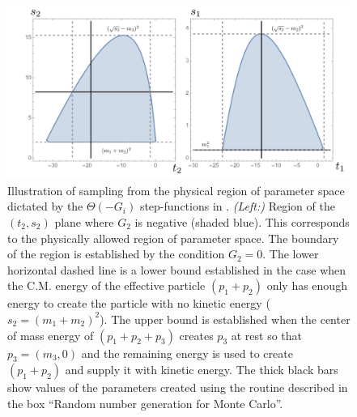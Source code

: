 \begin{figure}[htbp]
    \centering
    \includegraphics[width=0.9\linewidth]{figs/kinematic-variable-diagram.png}
    \caption{
        Illustration of sampling from the physical region of parameter space dictated by the $\Theta(-G_i)$ step-functions in . 
        \emph{(Left:)}
        Region of the $(t_2, s_2)$ plane where $G_2$ is negative (shaded blue).
        This corresponds to the physically allowed region of parameter space.
        The boundary of the region is established by the condition $G_2 = 0$.
        The lower horizontal dashed line is a lower bound established in the case when the C.M. energy of the effective particle $(p_1 + p_2)$ only has enough energy to create the particle with no kinetic energy ($s_2 = (m_1 + m_2)^2$). 
        The upper bound is established when the center of mass energy of $(p_1 + p_2 + p_3)$ creates $p_3$ at rest so that $p_3 = (m_3, 0)$ and the remaining energy is used to create $(p_1 + p_2)$ and supply it with kinetic energy.
        The thick black bars show values of the parameters created using the routine described in the box ``Random number generation for Monte Carlo''.
    }
    \label{<label>}
\end{figure}

